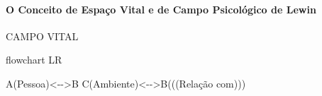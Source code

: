\documentclass[
]{book}
\newenvironment{Shaded}{\begin{snugshade}}{\end{snugshade}}
\newcommand{\NormalTok}[1]{#1}
\begin{document}
\hypertarget{o-conceito-de-espauxe7o-vital-e-de-campo-psicoluxf3gico-de-lewin}{%
\paragraph{\texorpdfstring{O Conceito de \textbf{Espaço Vital} e de \textbf{Campo Psicológico} de Lewin}{O Conceito de Espaço Vital e de Campo Psicológico de Lewin}}\label{o-conceito-de-espauxe7o-vital-e-de-campo-psicoluxf3gico-de-lewin}}

CAMPO VITAL

\begin{Shaded}
\begin{Highlighting}[]
\NormalTok{flowchart LR}

\NormalTok{A(Pessoa)\textless{}{-}{-}\textgreater{}B}
\NormalTok{C(Ambiente)\textless{}{-}{-}\textgreater{}B(((Relação com)))}
\end{Highlighting}
\end{Shaded}
\end{document}

